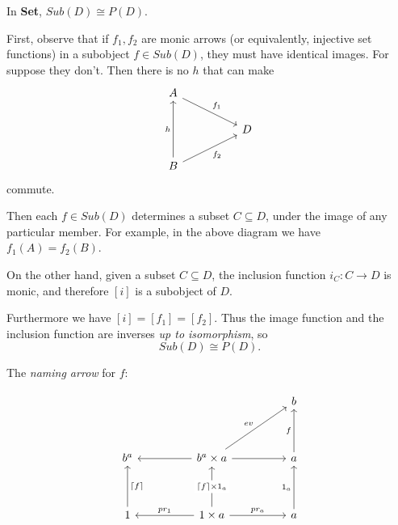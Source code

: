     \begin{exercise}
        In \textbf{Set}, $Sub(D) \cong P(D)$.

        First, observe that if $f_1, f_2$ are monic arrows (or equivalently, injective set functions) in a subobject $f \in Sub(D)$, they must have identical images.
        For suppose they don't. Then there is no $h$ that can make
        \[\begin{tikzcd}
            {A} \\
            && {D} \\
            {B}
            \arrow["{f_1}", from=1-1, to=2-3]
            \arrow["{f_2}"', from=3-1, to=2-3]
            \arrow["{h}", from=3-1, to=1-1]
        \end{tikzcd}\]
        commute.

        Then each $f \in Sub(D)$ determines a subset $C \subseteq D$, under the image of any particular member. For example, in the above diagram we have $f_1(A) = f_2(B)$. 

        On the other hand, given a subset $C \subseteq D$, the inclusion function $i_C : C \to D$ is monic, and therefore $[i]$ is a subobject of $D$.

        Furthermore we have $[i] = [f_1] = [f_2]$. Thus the image function and the inclusion function are inverses \emph{up to isomorphism},
        so
        $$Sub(D) \cong P(D).$$

    \end{exercise}

    \begin{defi}
        The \emph{naming arrow} for $f$:

        \[\begin{tikzcd}
            &&&& {b} \\
            \\
            {b^a} && {b^a \times a} && {a} \\
            \\
            {1} && {1 \times a} && {a}
            \arrow["{pr_a}", from=5-3, to=5-5]
            \arrow["{pr_1}"', from=5-3, to=5-1]
            \arrow["{\lceil f \rceil}"', from=5-1, to=3-1]
            \arrow["{\lceil f \rceil \times 1_a}" description, from=5-3, to=3-3]
            \arrow[from=3-3, to=3-1]
            \arrow[from=3-3, to=3-5]
            \arrow["{ev}", from=3-3, to=1-5]
            \arrow["{f}", from=3-5, to=1-5]
            \arrow["{1_a}", from=5-5, to=3-5]
        \end{tikzcd}\]
    \end{defi}

